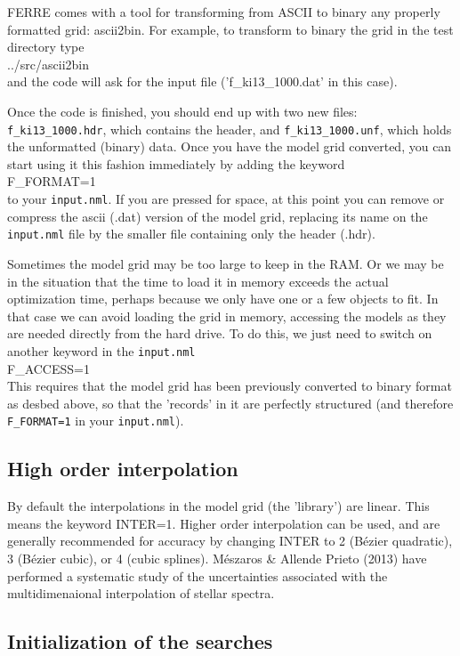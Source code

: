 \documentclass[12pt]{article}
\begin{document}
FERRE comes with a tool for transforming from ASCII to
binary any properly formatted grid: ascii2bin. 
For example, to transform to binary the grid in the test directory type \\
../src/ascii2bin \\
and the code will ask for the input file ('f\_ki13\_1000.dat' in this case). 

Once the code is finished, you should end up with two new files: {\tt f\_ki13\_1000.hdr},
which contains the header, and {\tt f\_ki13\_1000.unf}, which holds the unformatted (binary)
data. Once you have the model grid converted, you can start using it this fashion
immediately by adding the keyword \\
F\_FORMAT=1 \\
to your {\tt input.nml}. If you are pressed for space, at this point you can 
remove or compress the ascii (.dat) version of the model grid, replacing its name 
on the {\tt input.nml} file by the smaller file containing only the header (.hdr).

Sometimes the model grid may be too large to keep in the RAM. Or we may be
in the situation that the time to load it in memory exceeds the actual 
optimization time, perhaps because we only have one or a few objects to fit. In that
case we can avoid loading the grid in memory, accessing the models as they are
needed directly from the hard drive. To do this, we just need to switch on another
keyword in the {\tt input.nml} \\
F\_ACCESS=1\\
This requires that the model grid has been previously converted to binary format as desbed above, 
so that the 'records' in it are perfectly structured (and therefore {\tt F\_FORMAT=1} 
in your {\tt input.nml}).

\subsection{High order interpolation}

By default the interpolations in the model grid (the 'library') are linear.
This means the keyword INTER=1. Higher order interpolation can be used, and
are generally recommended for accuracy by changing INTER to 2 (B\'ezier quadratic),
3 (B\'ezier cubic), or 4 (cubic splines). M\'eszaros \& Allende Prieto (2013) have
performed a systematic study of the uncertainties associated with the
multidimenaional interpolation of stellar spectra.

\subsection{Initialization of the searches}
\label{init}
\end{document}
